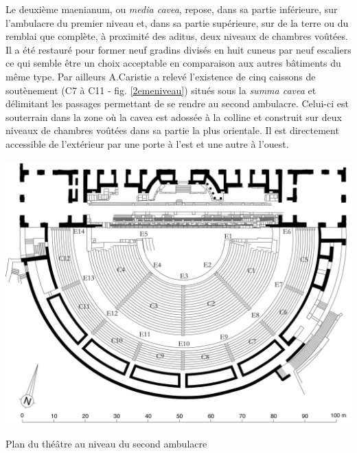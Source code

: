 		Le deuxième \gls{maenianum}, ou \textit{media cavea}, repose, dans sa partie inférieure, sur l'\gls{ambulacre} du premier niveau et, dans sa partie supérieure, sur de la terre ou du remblai que complète, à proximité des \gls{aditus}, deux niveaux de chambres voûtées. Il a été restauré pour former neuf gradins divisés en huit \gls{cuneus} par neuf escaliers ce qui semble être un choix acceptable en comparaison aux autres bâtiments du même type. Par ailleurs A.Caristie a relevé l'existence de cinq caissons de soutènement (C7 à C11 - fig. \ref{2emeniveau}) situés sous la \textit{summa cavea} et délimitant les passages permettant de se rendre au second \gls{ambulacre}. Celui-ci est souterrain dans la zone où la \gls{cavea} est adossée à la colline et construit sur deux niveaux de chambres voûtées dans sa partie la plus orientale. Il est directement accessible de l'extérieur par une porte à l'est et une autre à l'ouest.
		
	\begin{figureth}
		\includegraphics[width=\linewidth]{images/2emeniveau}
		\caption[Vue de dessus - 2ème niveau]{Plan du théâtre au niveau du second \gls{ambulacre} \cite[Pl. XVIII]{orangePl}}
		\label{2emeniveau}
	\end{figureth}		
		
